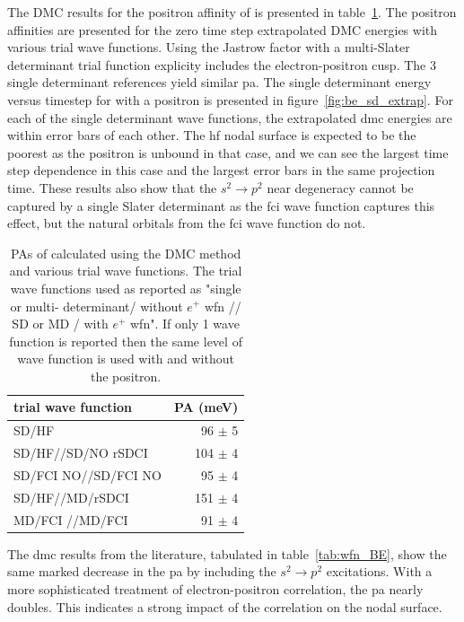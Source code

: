 The DMC results for the positron affinity of  is presented in table~\ref{tab:DMC_BE}.
The positron affinities are presented for the zero time step extrapolated DMC energies with various trial wave functions.
Using the Jastrow factor with a multi-Slater determinant trial function explicity includes the electron-positron cusp.
The 3 single determinant references yield similar \gls{pa}.
The single determinant energy versus timestep for  with a positron is presented in figure~\ref{fig:be_sd_extrap}.
For each of the single determinant wave functions, the extrapolated \gls{dmc} energies are within error bars of each other.
The \gls{hf} nodal surface is expected to be the poorest as the positron is unbound in that case, and we can see the largest time step dependence in this case and the largest error bars in the same projection time.
These results also show that the $s^2 \rightarrow p^2$ near degeneracy cannot be captured by a single Slater determinant as the \gls{fci} wave function captures this effect, but the natural orbitals from the \gls{fci} wave function do not.

\begin{table}
    \caption{\label{tab:DMC_BE} PAs of  calculated using the DMC method and various trial wave functions. The trial wave functions used as reported as "single or multi- determinant/ without $e^{+}$ wfn // SD or MD / with $e^{+}$ wfn". If only 1 wave function is reported then the same level of wave function is used with and without the positron. }
    \begin{tabular}{lr}
trial wave function          &  PA (meV) \\ \hline
SD/HF                        &  96  $\pm$ 5 \\
SD/HF//SD/NO rSDCI           &  104 $\pm$ 4 \\
SD/FCI NO//SD/FCI NO         &  95  $\pm$ 4 \\ \hline
SD/HF//MD/rSDCI              &  151 $\pm$ 4 \\
MD/FCI   //MD/FCI            &  91 $\pm$  4 \\
\end{tabular}
\end{table}

The \gls{dmc} results from the literature, tabulated in table~\ref{tab:wfn_BE}, show the same marked decrease in the \gls{pa} by including the $s^2\rightarrow p^2$ excitations.
With a more sophisticated treatment of electron-positron correlation, the \gls{pa} nearly doubles.\cite{10.1021/acs.jctc.1c01193}
This indicates a strong impact of the correlation on the nodal surface.

